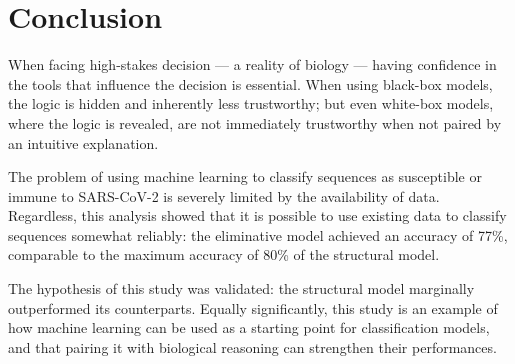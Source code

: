 \section{Conclusion}

When facing high-stakes decision --- a reality of biology --- having confidence in the tools that influence the decision is essential. When using black-box models, the logic is hidden and inherently less trustworthy; but even white-box models, where the logic is revealed, are not immediately trustworthy when not paired by an intuitive explanation.

The problem of using machine learning to classify sequences as susceptible or immune to SARS-CoV-2 is severely limited by the availability of data. Regardless, this analysis showed that it is possible to use existing data to classify sequences somewhat reliably: the eliminative model achieved an accuracy of 77\%, comparable to the maximum accuracy of 80\% of the structural model.

The hypothesis of this study was validated: the structural model marginally outperformed its counterparts. Equally significantly, this study is an example of how machine learning can be used as a starting point for classification models, and that pairing it with biological reasoning can strengthen their performances.


